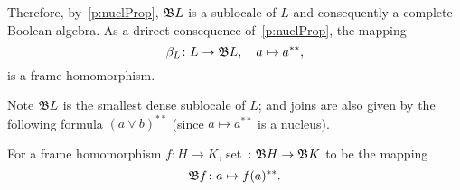     Therefore, by~\ref{p:nuclProp}, $\mathfrak{B} L$ is a sublocale of $L$ and consequently a complete Boolean algebra. As a drirect consequence of~\ref{p:nuclProp}, the mapping
    $$\text{\DEFSYM{BetaL}{$\beta_L$}}\colon L \to \Bo L,\quad a \mapsto a^{**},$$
    is a frame homomorphism.

\begin{block}{Note}
    $\mathfrak{B} L$ is the smallest dense sublocale of $L$; and joins are also given by the following formula $(a \vee b)^{**}$ (since $a \mapsto a^{**}$ is a nucleus).
\end{block}


\begin{definition}\label{d:BooleanizationMorph}
    For a frame homomorphism $f\colon H \to K$, set $\colon \mathfrak{B} H \to \mathfrak{B} K$ to be the mapping
    $$\mathfrak{B} f\colon a \mapsto f(a)^{**}.$$
\end{definition}

